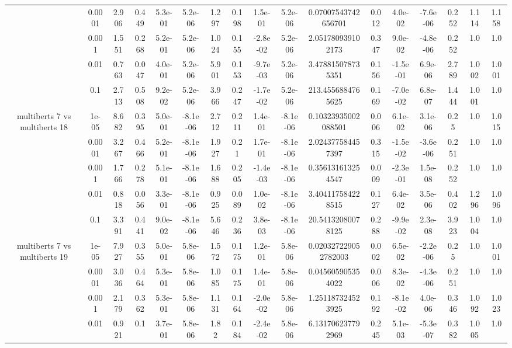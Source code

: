 \begin{tabular}{|c|c|c|c|c|c|c|c|c|c|c|c|c|c|c|c|c|}
 & 0.0001 & 2.906 & 0.449 & 5.3e-01 & 5.2e-06 & 1.297 & 0.198 & 1.5e-01 & 5.2e-06 & 0.07007543742656701 & 0.012 & 4.0e-02 & -7.6e-06 & 0.252 & 1.114 & 1.158 \\
 & 0.001 & 1.551 & 0.268 & 5.2e-01 & 5.2e-06 & 1.024 & 0.155 & -2.8e-02 & 5.2e-06 & 2.051780939102173 & 0.347 & 9.0e-02 & -4.8e-06 & 0.252 & 1.0 & 1.0 \\
 & 0.01 & 0.763 & 0.047 & 4.0e-01 & 5.2e-06 & 5.901 & 0.153 & -9.7e-03 & 5.2e-06 & 3.478815078735351 & 0.156 & -1.5e-01 & 6.9e-06 & 2.789 & 1.002 & 1.001 \\
 & 0.1 & 2.713 & 0.508 & 9.2e-02 & 5.2e-06 & 3.966 & 0.247 & -1.7e-02 & 5.2e-06 & 213.4556884765625 & 0.169 & -7.0e-02 & 6.8e-07 & 1.444 & 1.001 & 1.0 \\
\hline
\multirow{5}{*}{multiberts 7 vs multiberts 18} & 1e-05 & 8.682 & 0.395 & 5.0e-01 & -8.1e-06 & 2.712 & 0.211 & 1.4e-01 & -8.1e-06 & 0.10323935002088501 & 0.006 & 6.1e-02 & 3.1e-06 & 0.25 & 1.0 & 1.015 \\
 & 0.0001 & 3.267 & 0.466 & 5.2e-01 & -8.1e-06 & 1.927 & 0.21 & 1.7e-01 & -8.1e-06 & 2.024377584457397 & 0.315 & -1.5e-02 & -3.6e-06 & 0.251 & 1.0 & 1.0 \\
 & 0.001 & 1.766 & 0.278 & 5.1e-01 & -8.1e-06 & 1.688 & 0.205 & -1.4e-03 & -8.1e-06 & 0.356131613254547 & 0.009 & -2.3e-01 & 1.5e-08 & 0.252 & 1.0 & 1.0 \\
 & 0.01 & 0.818 & 0.056 & 3.3e-01 & -8.1e-06 & 0.925 & 0.089 & 1.0e-02 & -8.1e-06 & 3.404117584228515 & 0.127 & 6.4e-02 & 3.5e-06 & 0.402 & 1.296 & 1.096 \\
 & 0.1 & 3.391 & 0.441 & 9.0e-02 & -8.1e-06 & 5.646 & 0.236 & 3.8e-03 & -8.1e-06 & 20.54132080078125 & 0.288 & -9.9e-02 & 2.3e-08 & 3.923 & 1.004 & 1.0 \\
\hline
\multirow{5}{*}{multiberts 7 vs multiberts 19} & 1e-05 & 7.927 & 0.355 & 5.0e-01 & 5.8e-06 & 1.572 & 0.175 & 1.2e-01 & 5.8e-06 & 0.020327229052782003 & 0.002 & 6.5e-02 & -2.2e-06 & 0.25 & 1.0 & 1.001 \\
 & 0.0001 & 3.036 & 0.464 & 5.3e-01 & 5.8e-06 & 1.085 & 0.175 & 1.4e-01 & 5.8e-06 & 0.045605905354022 & 0.006 & 8.3e-02 & -4.3e-06 & 0.251 & 1.0 & 1.0 \\
 & 0.001 & 2.179 & 0.362 & 5.3e-01 & 5.8e-06 & 1.131 & 0.164 & -2.0e-02 & 5.8e-06 & 1.251187324523925 & 0.192 & -8.1e-02 & 4.0e-06 & 0.346 & 1.092 & 1.023 \\
 & 0.01 & 0.921 & 0.1 & 3.7e-01 & 5.8e-06 & 1.82 & 0.184 & -2.4e-02 & 5.8e-06 & 6.131706237792969 & 0.245 & 5.1e-03 & -5.3e-07 & 0.382 & 1.005 & 1.0 \\

\end{tabular}
